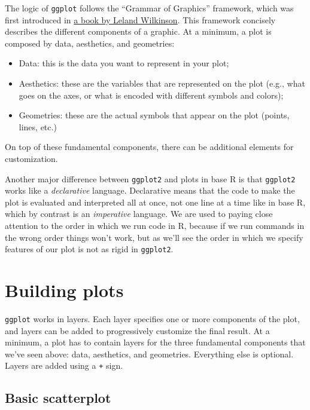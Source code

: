 \documentclass[
]{book}
\providecommand{\tightlist}{%
  \setlength{\itemsep}{0pt}\setlength{\parskip}{0pt}}
\begin{document}
The logic of \texttt{ggplot} follows the ``Grammar of Graphics'' framework, which was
first introduced in \href{https://www.springer.com/in/book/9780387245447}{a book by Leland Wilkinson}. This framework
concisely describes the different components of a graphic. At a minimum, a plot
is composed by data, aesthetics, and geometries:

\begin{itemize}
\tightlist
\item
  Data: this is the data you want to represent in your plot;
\item
  Aesthetics: these are the variables that are represented on the plot (e.g.,
  what goes on the axes, or what is encoded with different symbols and colors);
\item
  Geometries: these are the actual symbols that appear on the plot (points,
  lines, etc.)
\end{itemize}

On top of these fundamental components, there can be additional elements for
customization.

Another major difference between \texttt{ggplot2} and plots in base R is that \texttt{ggplot2}
works like a \emph{declarative} language. Declarative means that the code to make the
plot is evaluated and interpreted all at once, not one line at a time like in
base R, which by contrast is an \emph{imperative} language. We are used to paying
close attention to the order in which we run code in R, because if we run
commands in the wrong order things won't work, but as we'll see the order in
which we specify features of our plot is not as rigid in \texttt{ggplot2}.

\hypertarget{building-plots}{%
\section{Building plots}\label{building-plots}}

\texttt{ggplot} works in layers. Each layer specifies one or more components of the
plot, and layers can be added to progressively customize the final result. At a
minimum, a plot has to contain layers for the three fundamental
components that we've seen above: data, aesthetics, and geometries. Everything
else is optional. Layers are added using a \texttt{+} sign.

\hypertarget{basic-scatterplot}{%
\subsection{Basic scatterplot}\label{basic-scatterplot}}
\end{document}
